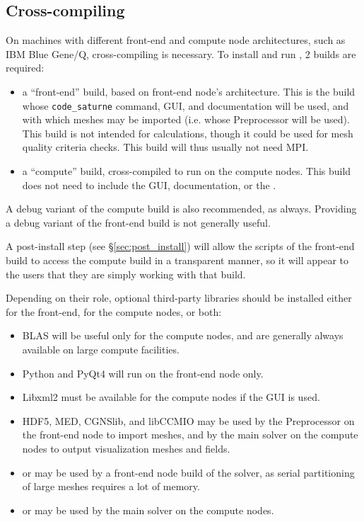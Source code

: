 \documentclass[a4paper,10pt,twoside]{csshortdoc}
\begin{document}
\subsection{Cross-compiling}

On machines with different front-end and compute node architectures,
such as IBM Blue Gene/Q, cross-compiling is necessary.
To install and run \CS, 2 builds are required:

\begin{itemize}
\item a ``front-end'' build, based on front-end node's architecture. This is
      the build whose \texttt{code\_saturne} command, GUI, and documentation
      will be used, and with which meshes may be imported (i.e. whose
      Preprocessor will be used). This build is not intended for calculations,
      though it could be used for mesh quality criteria checks.
      This build will thus usually not need  MPI.
\item a ``compute'' build, cross-compiled to run on the compute nodes.
      This build does not need to include the GUI, documentation, or
      the \pcs.
\end{itemize}

A debug variant of the compute build is also recommended, as always.
Providing a debug variant of the front-end build is not generally useful.

A post-install step (see \S\ref{sec:post_install}) will allow
the scripts of the front-end build to access the compute build in a transparent
manner, so it will appear to the users that they are simply working with that
build.

Depending on their role, optional third-party libraries should be installed
either for the front-end, for the compute nodes, or both:

\begin{itemize}
\item BLAS will be useful only for the compute nodes, and are generally
      always available on large compute facilities.
\item Python and PyQt4 will run on the front-end node only.
\item Libxml2 must be available for the compute nodes if the GUI is used.
\item HDF5, MED, CGNSlib, and libCCMIO may be used by the Preprocessor on
      the front-end node to import meshes, and by the main solver on the
      compute nodes to output visualization meshes and fields.
\item \scotch or \metis may be used by a front-end node build of the
      solver, as serial partitioning of large meshes requires a lot of memory.
\item \ptscotch or \parmetis may be used by the main solver on the
      compute nodes.
\end{itemize}
\end{document}
